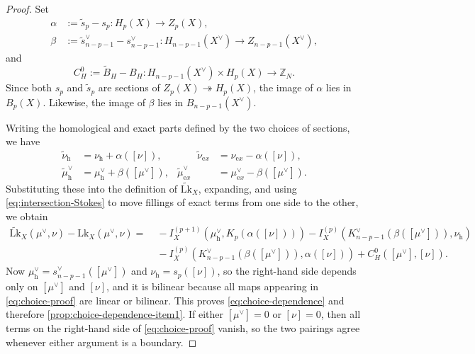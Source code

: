 \documentclass[dvipsnames,a4paper]{article}
\numberwithin{equation}{section}
\theoremstyle{definition}
\theoremstyle{remark}
\newcommand{\Lk}{\mathrm{Lk}}
\begin{document}
\begin{proof}
	Set
	\begin{equation}
		\begin{aligned}
			\alpha&:=\widetilde s_p-s_p:H_p(X)\to Z_p(X),
			\\
			\beta&:=\widetilde s^\vee_{n-p-1}-s^\vee_{n-p-1}:H_{n-p-1}(X^\vee)\to Z_{n-p-1}(X^\vee),
		\end{aligned}
		\label{eq:secDiffs}
	\end{equation}
	and
	\begin{equation}
		C_H^{0}:=\widetilde B_H-B_H:
		H_{n-p-1}(X^\vee)\times H_p(X)\to \mathbb Z_N.
	\end{equation}
	Since both \(s_p\) and \(\widetilde s_p\) are sections of
	\(Z_p(X)\twoheadrightarrow H_p(X)\), the image of \(\alpha\) lies in \(B_p(X)\).
	Likewise, the image of \(\beta\) lies in \(B_{n-p-1}(X^\vee)\).
	
	Writing the homological and exact parts defined by the two choices of sections, we have
	\begin{equation}
		\begin{aligned}
			\widetilde\nu_{\mathrm h}&=\nu_{\mathrm h}+\alpha([\nu]),
			&\qquad
			\widetilde\nu_{\mathrm ex}&=\nu_{\mathrm ex}-\alpha([\nu]),
			\\
			\widetilde\mu^\vee_{\mathrm h}&=\mu^\vee_{\mathrm h}+\beta([\mu^\vee]),
			&
			\widetilde\mu^\vee_{\mathrm ex}&=\mu^\vee_{\mathrm ex}-\beta([\mu^\vee]).
		\end{aligned}
	\end{equation}
	Substituting these into the definition of \(\widetilde{\Lk}_X\), expanding, and using
	\eqref{eq:intersection-Stokes} to move fillings of exact terms from one side to the
	other, we obtain
	\begin{equation}
		\begin{aligned}
			\widetilde{\Lk}_X(\mu^\vee,\nu)-\Lk_X(\mu^\vee,\nu)
			=&\;
			-I_X^{(p+1)}\left(\mu^\vee_{\mathrm h},K_p(\alpha([\nu]))\right)
			-I_X^{(p)}\left(K^\vee_{n-p-1}(\beta([\mu^\vee])),\nu_{\mathrm h}\right)
			\\
			&\;
			-I_X^{(p)}\left(K^\vee_{n-p-1}(\beta([\mu^\vee])),\alpha([\nu])\right)
			+C_H^{0}([\mu^\vee],[\nu]).
		\end{aligned}
		\label{eq:choice-proof}
	\end{equation}
	Now \(\mu^\vee_{\mathrm h}=s^\vee_{n-p-1}([\mu^\vee])\) and
	\(\nu_{\mathrm h}=s_p([\nu])\), so the right-hand side depends only on
	\([\mu^\vee]\) and \([\nu]\), and it is bilinear because all maps appearing in
	\eqref{eq:choice-proof} are linear or bilinear. This proves
	\eqref{eq:choice-dependence} and therefore
	\ref{prop:choice-dependence-item1}. If either \([\mu^\vee]=0\) or \([\nu]=0\),
	then all terms on the right-hand side of \eqref{eq:choice-proof} vanish, so the two
	pairings agree whenever either argument is a boundary.
	

\end{proof}
\end{document}
